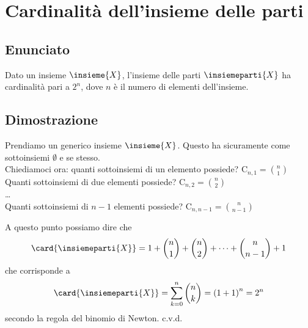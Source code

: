 \documentclass[../../analisi1]{subfiles}
\begin{document}
    \chapter{Cardinalità dell'insieme delle parti}

        \section*{Enunciato}

            Dato un insieme \(\insieme{X}\), l'insieme delle parti \(\insiemeparti{X}\) ha cardinalità pari a \(2^n\), dove \(n\) è il numero di elementi dell'insieme.

        \section*{Dimostrazione}

            Prendiamo un generico insieme \(\insieme{X}\). Questo ha sicuramente come sottoinsiemi \(\emptyset\) e se stesso.\\
            Chiediamoci ora: quanti sottoinsiemi di un elemento possiede? \(\mathrm{C}_{n, 1} = \binom{n}{1}\)\\
            Quanti sottoinsiemi di due elementi possiede? \(\mathrm{C}_{n, 2} = \binom{n}{2}\)\\
            \dots\\
            Quanti sottoinsiemi di \(n - 1\) elementi possiede? \(\mathrm{C}_{n, n - 1} = \binom{n}{n - 1}\)

            A questo punto possiamo dire che
            \[
                \card{\insiemeparti{X}} = 1 + \binom{n}{1} + \binom{n}{2} + \dots + \binom{n}{n - 1} + 1
            \]
            che corrisponde a
            \[
                \card{\insiemeparti{X}} = \sum_{k = 0}^n \binom{n}{k} = {(1 + 1)}^n = 2^n
            \]
            secondo la regola del binomio di Newton. c.v.d.
    
\end{document}
